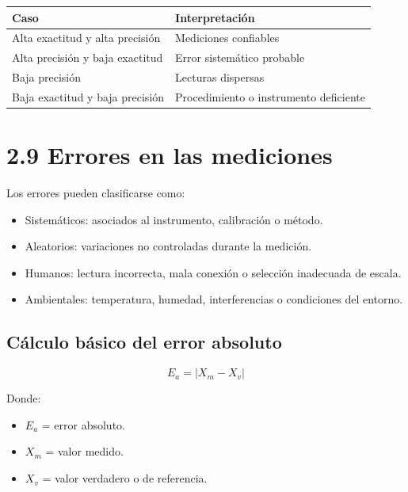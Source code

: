 \documentclass[
  spanish,
  letterpaper,
  DIV=11,
  numbers=noendperiod]{scrreprt}
\newcounter{none} %
\providecommand{\tightlist}{%
  \setlength{\itemsep}{0pt}\setlength{\parskip}{0pt}}
\begin{document}
{\def\LTcaptype{none} %
\begin{longtable}[]{@{}
  >{\raggedright\arraybackslash}p{}
  >{\raggedright\arraybackslash}p{}@{}}
\toprule\noalign{}
\begin{minipage}[b]{\linewidth}\raggedright
Caso
\end{minipage} & \begin{minipage}[b]{\linewidth}\raggedright
Interpretación
\end{minipage} \\
\midrule\noalign{}
\endhead
\bottomrule\noalign{}
\endlastfoot
Alta exactitud y alta precisión & Mediciones confiables \\
Alta precisión y baja exactitud & Error sistemático probable \\
Baja precisión & Lecturas dispersas \\
Baja exactitud y baja precisión & Procedimiento o instrumento
deficiente \\
\end{longtable}
}

\section{2.9 Errores en las mediciones}\label{errores-en-las-mediciones}

Los errores pueden clasificarse como:

\begin{itemize}
\tightlist
\item
  Sistemáticos: asociados al instrumento, calibración o método.
\item
  Aleatorios: variaciones no controladas durante la medición.
\item
  Humanos: lectura incorrecta, mala conexión o selección inadecuada de
  escala.
\item
  Ambientales: temperatura, humedad, interferencias o condiciones del
  entorno.
\end{itemize}

\subsection{Cálculo básico del error
absoluto}\label{cuxe1lculo-buxe1sico-del-error-absoluto}

\[
E_a = |X_m - X_v|
\]

Donde:

\begin{itemize}
\tightlist
\item
  \(E_a\) = error absoluto.
\item
  \(X_m\) = valor medido.
\item
  \(X_v\) = valor verdadero o de referencia.
\end{itemize}
\end{document}
